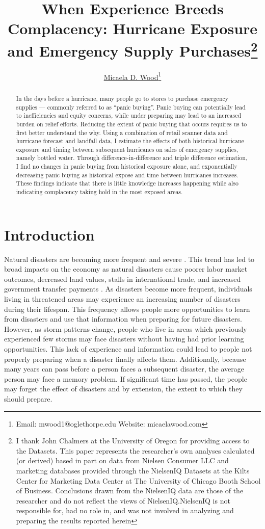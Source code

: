 \documentclass{article}
\title{When Experience Breeds Complacency: Hurricane Exposure and Emergency Supply Purchases\footnote{I thank John Chalmers at the University of Oregon for providing access to the \citeauthor{Nielsen} Datasets. This paper represents the researcher's own analyses calculated (or derived) based in part on data from Nielsen Consumer LLC and marketing databases provided through the NielsenIQ Datasets at the Kilts Center for Marketing Data Center at The University of Chicago Booth School of Business. Conclusions drawn from the NielsenIQ data are those of the researcher and do not reflect the views of NielsenIQ.\@ NielsenIQ is not responsible for, had no role in, and was not involved in analyzing and preparing the results reported herein}}
\author{\href{https://www.micaelawood.com/}{Micaela D. Wood}\footnote{Email: mwood1@oglethorpe.edu Website: micaelawood.com}}
\date{}
\begin{document}
\maketitle

\begin{abstract}
In the days before a hurricane, many people go to stores to purchase emergency supplies --- commonly referred to as ``panic buying''.  Panic buying can potentially lead to inefficiencies and equity concerns, while under preparing may lead to an increased burden on relief efforts. Reducing the extent of panic buying that occurs requires us to first better understand the why. Using a combination of retail scanner data and hurricane forecast and landfall data, I estimate the effects of both historical hurricane exposure and timing between subsequent hurricanes on sales of emergency supplies, namely bottled water. Through difference-in-difference and triple difference estimation, I find no changes in panic buying from historical exposure alone, and exponentially decreasing panic buying as historical expose and time between hurricanes increases. These findings indicate that there is little knowledge increases happening while also indicating complacency taking hold in the most exposed areas.  
\end{abstract}

\section{Introduction}

Natural disasters are becoming more frequent and severe \citep{anderson2006climate, van2006impacts}. This trend has led to broad impacts on the economy as natural disasters cause poorer labor market outcomes, decreased land values, stalls in international trade, and increased government transfer payments \citep{ibarraran2009climate, deryugina2017fiscal, deryugina2018economic, sytsma2020impact}. As disasters become more frequent, individuals living in threatened areas may experience an increasing number of disasters during their lifespan. This frequency allows people more opportunities to learn from disasters and use that information when preparing for future disasters. However, as storm patterns change, people who live in areas which previously experienced few storms may face disasters without having had prior learning opportunities. This lack of experience and information could lead to people not properly preparing when a disaster finally affects them. Additionally, because many years can pass before a person faces a subsequent disaster, the average person may face a memory problem. If significant time has passed, the people may forget the effect of disasters and by extension, the extent to which they should prepare. 
\end{document}
